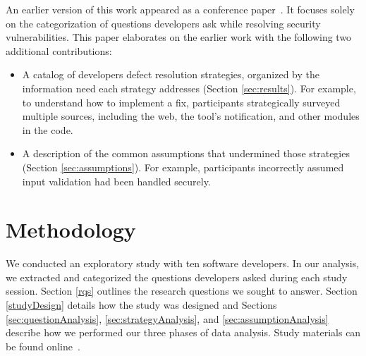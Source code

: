 \documentclass[10pt,journal,compsoc]{IEEEtran}
\begin{document}
An earlier version of this work appeared as a conference paper~\cite{Smith2015Questions}. 
It focuses solely on the categorization of questions developers ask while resolving security vulnerabilities. 
This paper elaborates on the earlier work with the following two additional contributions:

\begin{itemize}
	\item A catalog of developers defect resolution strategies, organized by the information need each strategy addresses (Section \ref{sec:results}). 
	For example, to understand how to implement a fix, participants strategically surveyed multiple sources, including the web, the tool's notification, and other modules in the code.
	\item A description of the common assumptions that undermined those strategies (Section \ref{sec:assumptions}). 
	For example, participants incorrectly assumed input validation had been handled securely.
\end{itemize}



\section{Methodology}
\label{sec:meth}
We conducted an exploratory study with ten software developers. In our analysis, we extracted and categorized the questions developers asked during each study session. 
Section \ref{rqs} outlines the research questions we sought to answer. 
Section \ref{studyDesign} details how the study was designed and Sections \ref{sec:questionAnalysis}, \ref{sec:strategyAnalysis}, and \ref{sec:assumptionAnalysis} describe how we performed our three phases of data analysis.
Study materials can be found online~\cite{ExperimentalMaterials}.
\end{document}
